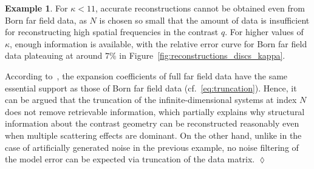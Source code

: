 \documentclass[11pt,a4paper]{article}
\theoremstyle{definition}
\newtheorem{example}[theorem]{Example}
\theoremstyle{remark} \newtheorem{remark}[theorem]{Remark}
\numberwithin{equation}{section}
\numberwithin{figure}{section}
\numberwithin{algorithm}{section}
\numberwithin{table}{section}
\begin{document}
\begin{example}
For $\kappa < 11$, accurate reconstructions cannot be obtained even from Born far field data, as $N$ is chosen so small that the amount of data is insufficient for reconstructing high spatial frequencies in the contrast $q$. For higher values of $\kappa$, enough information is available, with the relative error curve for Born far field data plateauing at around $7\%$ in Figure~\ref{fig:reconstructions_discs_kappa}.

According to~\cite{GriSch24}, the expansion coefficients of full far field data have the same essential support as those of Born far field data (cf.~\eqref{eq:truncation}).
Hence, it can be argued that the truncation of the infinite-dimensional systems at index $N$ does not remove retrievable information, which partially explains why structural information about the contrast geometry can be reconstructed reasonably even when multiple scattering effects are dominant. On the other hand, unlike in the case of artificially generated noise in the previous example, no noise filtering of the model error can be expected via truncation of the data matrix. %
\hfill$\lozenge$
\end{example}
\end{document}

